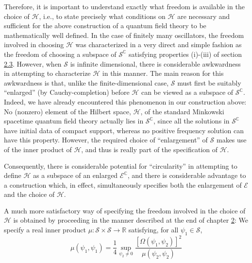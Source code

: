 \documentclass[11pt,a4paper]{article}
\begin{document}
Therefore, it is important to understand exactly what freedom is available in the choice of \(\mathcal{H}\), i.e., to state precisely what conditions on \(\mathcal{H}\) are necessary and sufficient for the above construction of a quantum field theory to be mathematically well defined. In the case of finitely many oscillators, the freedom involved in choosing \(\mathcal{H}\) was characterized in a very direct and simple fashion as the freedom of choosing a subspace of \(\mathcal{S}^{\mathbb C}\) satisfying properties (i)-(iii) of section \hyperlink{sec:2.3}{2.3}. However, when \(\mathcal{S}\) is infinite dimensional, there is considerable awkwardness in attempting to characterize \(\mathcal{H}\) in this manner. The main reason for this awkwardness is that, unlike the finite-dimensional case, \(\mathcal{S}\) must first be suitably ``enlarged'' (by Cauchy-completion) before \(\mathcal{H}\) can be viewed as a subspace of \( \mathcal{S}^{\mathbb{C}} \). Indeed, we have already encountered this phenomenon in our construction above: No (nonzero) element of the Hilbert space, \(\mathcal{H}\), of the standard Minkowski spacetime quantum field theory actually lies in \(\mathcal{S}^{\mathbb C}\), since all the solutions in \(\mathcal{S}^{\mathbb C}\) have initial data of compact support, whereas no positive frequency solution can have this property. However, the required choice of ``enlargement'' of \(\mathcal{S}\) makes use of the inner product of \(\mathcal{H}\), and thus is really part of the specification of \(\mathcal{H}\).

\hypertarget{source-54}{}

Consequently, there is considerable potential for ``circularity'' in attempting to define \(\mathcal{H}\) as a subspace of an enlarged \(\mathscr{E}^{\mathbb{C}}\), and there is considerable advantage to a construction which, in effect, simultaneously specifies both the enlargement of \(\mathscr{E}\) and the choice of \(\mathcal{H}\).

A much more satisfactory way of specifying the freedom involved in the choice of \(\mathcal{H}\) is obtained by proceeding in the manner described at the end of chapter \hyperlink{sec:2}{2}: We specify a real inner product \(\mu: \mathcal S \times \mathcal S \to \mathbb R\) satisfying, for all \(\psi_1 \in \mathcal S\),
\begin{equation*}
\mu(\psi_1, \psi_1) = \frac{1}{4} \sup_{\psi_2 \neq 0} \frac{[\Omega(\psi_1, \psi_2)]^2}{\mu(\psi_2, \psi_2)} \tag{3.2.16}\label{eq:3.2.16}
\end{equation*}
\end{document}
